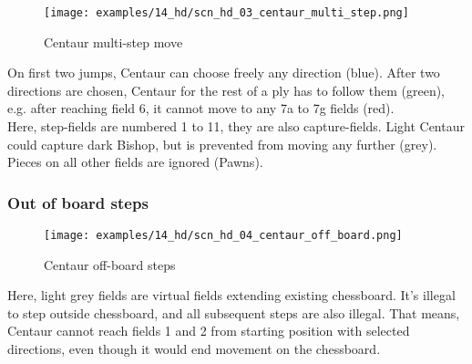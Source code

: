 

\clearpage %

\noindent
\begin{figure}[!h]
\texttt{[image: examples/14\_hd/scn\_hd\_03\_centaur\_multi\_step.png]}
\caption{Centaur multi-step move}
\label{fig:scn_hd_03_centaur_multi_step}
\end{figure}

On first two jumps, Centaur can choose freely any direction (blue). After
two directions are chosen, Centaur for the rest of a ply has to follow
them (green), e.g. after reaching field 6, it cannot move to any 7a to 7g
fields (red). \\
Here, step-fields are numbered 1 to 11, they are also capture-fields. Light
Centaur could capture dark Bishop, but is prevented from moving any further
(grey). Pieces on all other fields are ignored (Pawns).

\clearpage %

\subsubsection*{Out of board steps}

\vspace*{-0.05\textwidth}
\noindent
\begin{figure}[!h]
\texttt{[image: examples/14\_hd/scn\_hd\_04\_centaur\_off\_board.png]}
\caption{Centaur off-board steps}
\label{fig:scn_hd_04_centaur_off_board}
\end{figure}

Here, light grey fields are virtual fields extending existing chessboard.
It's illegal to step outside chessboard, and all subsequent steps are also
illegal. That means, Centaur cannot reach fields 1 and 2 from starting
position with selected directions, even though it would end movement on the
chessboard.

